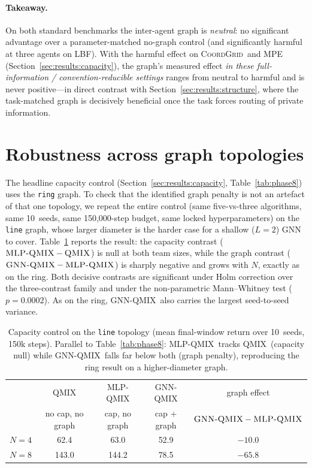 \documentclass[manuscript, screen, review]{jair}
\newcommand{\algoname}[1]{\textsc{#1}}
\newcommand{\qmix}{\algoname{QMIX}}
\newcommand{\gnnqmix}{\algoname{GNN-QMIX}}
\newcommand{\coordgrid}{\textsc{CoordGrid}}
\newcommand{\mlpqmix}{\algoname{MLP-QMIX}}
\newcommand{\PEsteps}{150{,}000}      %
\newcommand{\PEseeds}{10}             %
\newcommand{\PEmwuP}{0.0002}          %
\newcommand{\PLqmixNfour}{62.4}
\newcommand{\PLmlpNfour}{63.0}
\newcommand{\PLgnnNfour}{52.9}
\newcommand{\PLqmixNeight}{143.0}
\newcommand{\PLmlpNeight}{144.2}
\newcommand{\PLgnnNeight}{78.5}
\newcommand{\PLgraphGapNfour}{-10.0}  %
\newcommand{\PLgraphGapNeight}{-65.8} %
\begin{document}
\paragraph{Takeaway.} On both standard benchmarks the inter-agent graph is
\emph{neutral}: no significant advantage over a parameter-matched no-graph
control (and significantly harmful at three agents on LBF). With the harmful
effect on \coordgrid\ and MPE (Section~\ref{sec:results:capacity}), the
graph's measured effect \emph{in these full-information / convention-reducible
settings} ranges from neutral to harmful and is never positive---in direct
contrast with Section~\ref{sec:results:structure}, where the task-matched
graph is decisively beneficial once the task forces routing of private
information.

\section{Robustness across graph topologies}
\label{app:line}

The headline capacity control (Section~\ref{sec:results:capacity},
Table~\ref{tab:phase8}) uses the \texttt{ring} graph. To check that the
identified graph penalty is not an artefact of that one topology, we
repeat the entire control (same five-vs-three algorithms, same
\PEseeds\ seeds, same \PEsteps-step budget, same locked hyperparameters)
on the \texttt{line} graph, whose larger diameter is the harder case
for a shallow ($L{=}2$) GNN to cover. Table~\ref{tab:line} reports the
result: the capacity contrast ($\mlpqmix-\qmix$) is null at both team
sizes, while the graph contrast ($\gnnqmix-\mlpqmix$) is sharply negative
and grows with $N$, exactly as on the ring. Both decisive contrasts are
significant under Holm correction over the three-contrast family and under
the non-parametric Mann--Whitney test ($p=\PEmwuP$). As on the ring,
\gnnqmix\ also carries the largest seed-to-seed variance.

\begin{table}[!ht]
  \centering
  \small
  \caption{Capacity control on the \texttt{line} topology (mean
  final-window return over \PEseeds\ seeds, 150k steps). Parallel to
  Table~\ref{tab:phase8}: \mlpqmix\ tracks \qmix\ (capacity null) while
  \gnnqmix\ falls far below both (graph penalty), reproducing the ring
  result on a higher-diameter graph.}
  \label{tab:line}
  \begin{tabular}{lcccc}
    \toprule
    & \qmix & \mlpqmix & \gnnqmix & graph effect \\
    & {\footnotesize no cap, no graph} & {\footnotesize cap, no graph}
      & {\footnotesize cap + graph} & {\footnotesize $\gnnqmix-\mlpqmix$} \\
    \midrule
    $N=4$ & \PLqmixNfour & \PLmlpNfour & \PLgnnNfour & $\PLgraphGapNfour$ \\
    $N=8$ & \PLqmixNeight & \PLmlpNeight & \PLgnnNeight & $\PLgraphGapNeight$ \\
    \bottomrule
  \end{tabular}
\end{table}
\end{document}
